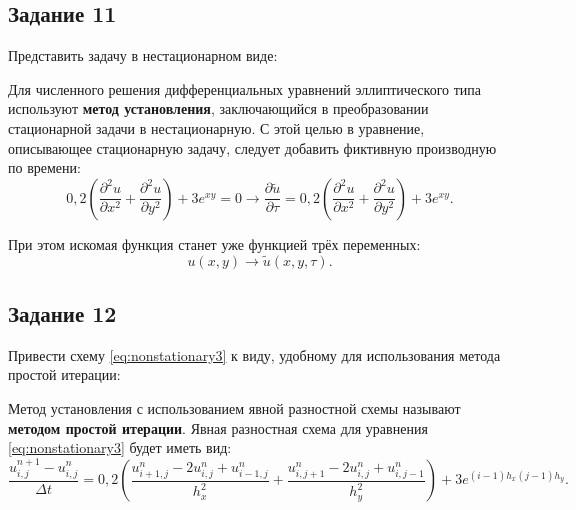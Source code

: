 \documentclass[12pt, a4paper]{report}
\begin{document}
\begin{center}
	\end{center}

	\subsection*{Задание 11}
	\large
	Представить задачу в нестационарном виде: \par
	Для численного решения дифференциальных уравнений эллиптического типа используют \textbf{метод установления}, заключающийся в преобразовании стационарной задачи в нестационарную. С этой целью в уравнение, описывающее стационарную задачу, следует добавить фиктивную производную по времени:
	\begin{equation}\label{eq:nonstationary3}
		0,2(\frac{\partial^{2} u}{\partial x^{2}} + \frac{\partial^{2} u}{\partial y^{2}}) + 3e^{xy} = 0 \rightarrow \frac{\partial \tilde{u}}{\partial \tau} = 0,2(\frac{\partial^{2} u}{\partial x^{2}} + \frac{\partial^{2} u}{\partial y^{2}}) + 3e^{xy}.
	\end{equation}
	\par
	При этом искомая функция станет уже функцией трёх переменных:
	\begin{equation*}
		u(x,y) \rightarrow \tilde{u}(x,y,\tau).
	\end{equation*}

	\subsection*{Задание 12}
	\large
	Привести схему \eqref{eq:nonstationary3} к виду, удобному для использования метода простой итерации: \par
	Метод установления с использованием явной разностной схемы называют \textbf{методом простой итерации}. Явная разностная схема для уравнения \eqref{eq:nonstationary3} будет иметь вид:
	\begin{equation}\label{eq:explicit3}
		\frac{u_{i, j}^{n+1} - u_{i, j}^{n}}{\Delta t} = 0,2(\frac{u_{i+1, j}^{n} - 2u_{i, j}^{n} + u_{i-1, j}^{n}}{h_{x}^{2}} + \frac{u_{i, j+1}^{n} - 2u_{i, j}^{n} + u_{i, j-1}^{n}}{h_{y}^{2}}) + 3e^{(i-1)h_{x}(j-1)h_{y}}.
	\end{equation}
\end{document}
